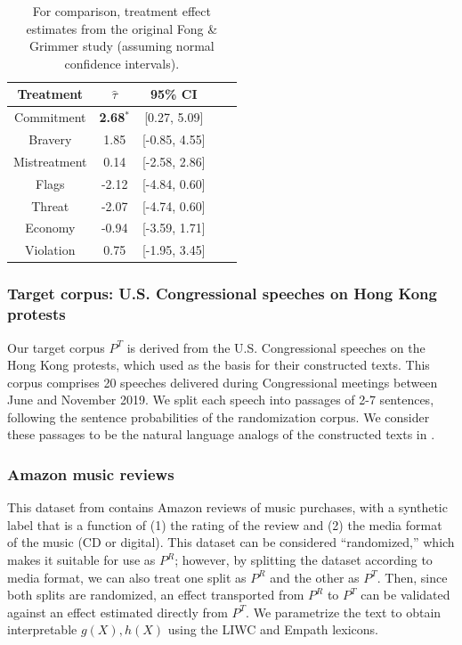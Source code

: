 \documentclass{article}
\begin{document}
\begin{table}[!ht]
    \centering
    \begin{tabular}{c|cccc}
        \toprule
        Treatment & $\hat{\tau}$ & 95\% CI \\
        \midrule
        Commitment & \textbf{\textcolor{green!50!black}{2.68$^*$}} & [0.27, 5.09] \\
        Bravery & \textcolor{green!50!black}{1.85} & [-0.85, 4.55] \\
        Mistreatment & \textcolor{green!50!black}{0.14} & [-2.58, 2.86] \\
        Flags & \textcolor{red!80!black}{-2.12} & [-4.84, 0.60] \\
        Threat & \textcolor{red!80!black}{-2.07} & [-4.74, 0.60]  \\
        Economy & \textcolor{red!80!black}{-0.94} & [-3.59, 1.71] \\
        Violation & \textcolor{green!50!black}{0.75} & [-1.95, 3.45] \\
        \bottomrule
    \end{tabular}
    \caption{For comparison, treatment effect estimates from the original Fong \& Grimmer study \cite{fong2021causal} (assuming normal confidence intervals).}
    \label{tab:results_baseline}
\end{table}

\subsubsection{Target corpus: U.S. Congressional speeches on Hong Kong protests}

Our target corpus $P^T$ is derived from the U.S. Congressional speeches on the Hong Kong protests, which \cite{fong2021causal} used as the basis for their constructed texts. This corpus comprises 20 speeches delivered during Congressional meetings between June and November 2019. We split each speech into passages of 2-7 sentences, following the sentence probabilities of the randomization corpus. We consider these passages to be the natural language analogs of the constructed texts in \cite{fong2021causal}.

\subsubsection{Amazon music reviews}

This dataset from \cite{przyant2021causal} contains Amazon reviews of music purchases, with a synthetic label that is a function of (1) the rating of the review and (2) the media format of the music (CD or digital). This dataset can be considered ``randomized,'' which makes it suitable for use as $P^R$; however, by splitting the dataset according to media format, we can also treat one split as $P^R$ and the other as $P^T$. Then, since both splits are randomized, an effect transported from $P^R$ to $P^T$ can be validated against an effect estimated directly from $P^T$. We parametrize the text to obtain interpretable $g(X), h(X)$ using the LIWC and Empath lexicons.
\end{document}
